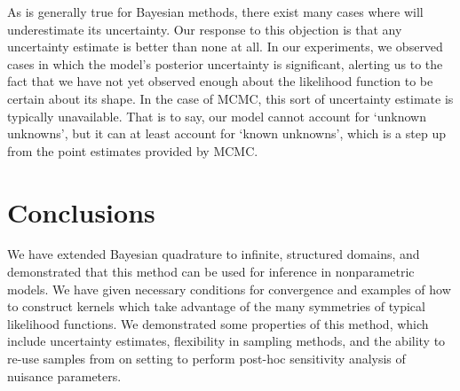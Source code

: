 As is generally true for Bayesian methods, there exist many cases where \bq{} will underestimate its uncertainty.  %
Our response to this objection is that any uncertainty estimate is better than none at all. In our experiments, we observed cases in which the model's posterior uncertainty is significant, alerting us to the fact that we have not yet observed enough about the likelihood function to be certain about its shape.  In the case of MCMC, this sort of uncertainty estimate is typically unavailable.  That is to say, our model cannot account for `unknown unknowns', but it can at least account for `known unknowns', which is a step up from the point estimates provided by MCMC.


\section{Conclusions}
We have extended Bayesian quadrature to infinite, structured domains, and demonstrated that this method can be used for inference in nonparametric models.  We have given necessary conditions for convergence and examples of how to construct kernels which take advantage of the many symmetries of typical likelihood functions.  We demonstrated some properties of this method, which include uncertainty estimates, flexibility in sampling methods, and the ability to re-use samples from on setting to perform post-hoc sensitivity analysis of nuisance parameters.




